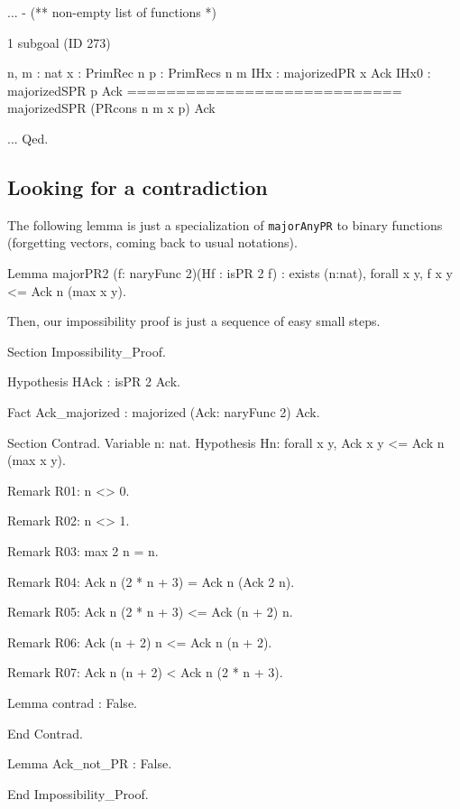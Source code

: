 \begin{Coqsrc}
  ...
- (** non-empty list of functions *)
\end{Coqsrc}

\begin{Coqanswer}
1 subgoal (ID 273)
  
  n, m : nat
  x : PrimRec n
  p : PrimRecs n m
  IHx : majorizedPR x Ack
  IHx0 : majorizedSPR p Ack
  ============================
  majorizedSPR (PRcons n m x p) Ack
\end{Coqanswer}
  
\begin{Coqsrc}
 ...
Qed.
\end{Coqsrc}

\subsection{Looking for a contradiction}

The following lemma is just a specialization of \texttt{majorAnyPR} to
binary functions (forgetting vectors, coming back to usual notations).

\begin{Coqsrc}
Lemma majorPR2 (f: naryFunc 2)(Hf : isPR 2 f)
  : exists (n:nat), forall x y,  f x y <= Ack n (max x  y).
\end{Coqsrc}

Then, our impossibility proof is just a sequence of easy small steps.

\begin{Coqsrc}
Section Impossibility_Proof.

  Hypothesis HAck : isPR 2 Ack.

  Fact Ack_majorized : majorized (Ack: naryFunc 2)  Ack.
  
  Section Contrad.
    Variable n: nat.
    Hypothesis  Hn: forall x y,  Ack x y <= Ack n (max x  y).

    Remark R01: n <> 0.
  
    Remark R02: n <> 1.
   
    Remark R03: max 2 n = n.
   
    Remark R04: Ack n (2 * n + 3) = Ack n (Ack 2 n).
       
    Remark R05: Ack n (2 * n + 3) <= Ack (n + 2) n.
   
    Remark R06: Ack (n + 2) n <= Ack n (n + 2).
   
    Remark R07: Ack n (n + 2) < Ack n (2 * n + 3).
   
    Lemma contrad : False.
   
  End Contrad.

  Lemma Ack_not_PR : False.

End Impossibility_Proof.
\end{Coqsrc}


